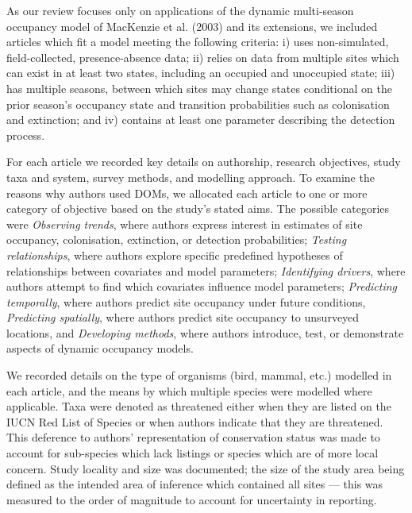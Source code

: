 \documentclass[
]{article}
\begin{document}
As our review focuses only on applications of the dynamic multi-season
occupancy model of MacKenzie et al. (2003) and its extensions, we
included articles which fit a model meeting the following criteria: i)
uses non-simulated, field-collected, presence-absence data; ii) relies
on data from multiple sites which can exist in at least two states,
including an occupied and unoccupied state; iii) has multiple seasons,
between which sites may change states conditional on the prior season's
occupancy state and transition probabilities such as colonisation and
extinction; and iv) contains at least one parameter describing the
detection process.

For each article we recorded key details on authorship, research
objectives, study taxa and system, survey methods, and modelling
approach. To examine the reasons why authors used DOMs, we allocated
each article to one or more category of objective based on the study's
stated aims. The possible categories were \emph{Observing trends}, where
authors express interest in estimates of site occupancy, colonisation,
extinction, or detection probabilities; \emph{Testing relationships},
where authors explore specific predefined hypotheses of relationships
between covariates and model parameters; \emph{Identifying drivers},
where authors attempt to find which covariates influence model
parameters; \emph{Predicting temporally}, where authors predict site
occupancy under future conditions, \emph{Predicting spatially}, where
authors predict site occupancy to unsurveyed locations, and
\emph{Developing methods}, where authors introduce, test, or demonstrate
aspects of dynamic occupancy models.

We recorded details on the type of organisms (bird, mammal, etc.)
modelled in each article, and the means by which multiple species were
modelled where applicable. Taxa were denoted as threatened either when
they are listed on the IUCN Red List of Species or when authors indicate
that they are threatened. This deference to authors' representation of
conservation status was made to account for sub-species which lack
listings or species which are of more local concern. Study locality and
size was documented; the size of the study area being defined as the
intended area of inference which contained all sites --- this was
measured to the order of magnitude to account for uncertainty in
reporting.
\end{document}
